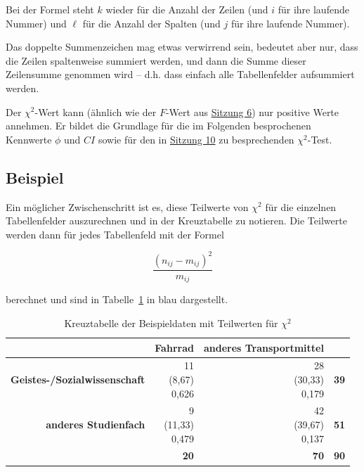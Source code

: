 \documentclass[
  11pt,
  ngerman,
  a4paper,
]{report}
\begin{document}
Bei der Formel steht \(k\) wieder für die Anzahl der Zeilen (und \(i\) für ihre laufende Nummer) und \(\ell\) für die Anzahl der Spalten (und \(j\) für ihre laufende Nummer).

Das doppelte Summenzeichen mag etwas verwirrend sein, bedeutet aber nur, dass die Zeilen spaltenweise summiert werden, und dann die Summe dieser Zeilensumme genommen wird -- d.h. dass einfach alle Tabellenfelder aufsummiert werden.

Der \(\chi^2\)-Wert kann (ähnlich wie der \(F\)-Wert aus \protect\hyperlink{die-f-verteilung}{Sitzung 6}) nur positive Werte annehmen. Er bildet die Grundlage für die im Folgenden besprochenen Kennwerte \(\phi\) und \(\mathit{CI}\) sowie für den in \href{chi-quadrat-tests.html}{Sitzung 10} zu besprechenden \(\chi^2\)-Test.

\hypertarget{beispiel-32}{%
\subsection{Beispiel}\label{beispiel-32}}

Ein möglicher Zwischenschritt ist es, diese Teilwerte von \(\chi^2\) für die einzelnen Tabellenfelder auszurechnen und in der Kreuztabelle zu notieren. Die Teilwerte werden dann für jedes Tabellenfeld mit der Formel

\nopagebreak

\[
\frac{(n_{ij}-m_{ij})^{2}}{m_{ij}}
\label{eq:contrib}
\]

berechnet und sind in Tabelle~\ref{tab:radchisq} in blau dargestellt.

\begin{table}

\caption{\label{tab:radchisq}Kreuztabelle der Beispieldaten mit Teilwerten für $\chi^2$}
\centering
\begin{tabular}[t]{>{}r|r>{}r|>{}r}
\toprule
\textbf{ } & \textbf{Fahrrad} & \textbf{anderes Transportmittel} & \textbf{  }\\
\midrule
\textbf{Geistes-/Sozialwissenschaft} & \makecell[tr]{11\\(8,67)\\\textcolor{goethe_blue}{0,626}} & \makecell[tr]{28\\(30,33)\\\textcolor{goethe_blue}{0,179}} & \textbf{39}\\
\textbf{anderes Studienfach} & \makecell[tr]{9\\(11,33)\\\textcolor{goethe_blue}{0,479}} & \makecell[tr]{42\\(39,67)\\\textcolor{goethe_blue}{0,137}} & \textbf{51}\\
\midrule
\textbf{\textbf{}} & \textbf{20} & \textbf{70} & \textbf{\textbf{90}}\\
\bottomrule
\end{tabular}
\end{table}
\end{document}
